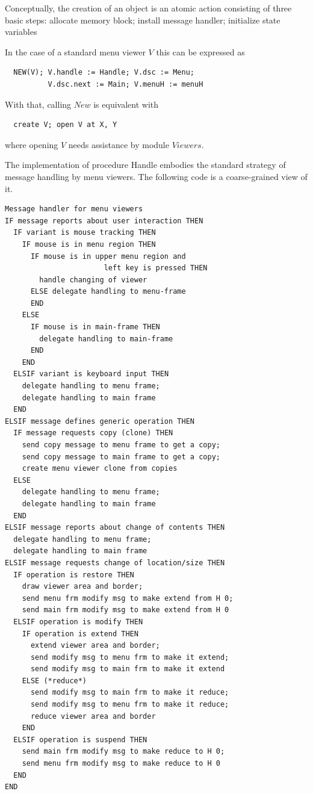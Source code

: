 Conceptually, the creation of an object is an atomic action consisting of three basic steps:
allocate memory block; install message handler; initialize state variables

In the case of a standard menu viewer $V$ this can be expressed as
\begin{verbatim}
  NEW(V); V.handle := Handle; V.dsc := Menu;
          V.dsc.next := Main; V.menuH := menuH
\end{verbatim}
With that, calling $New$ is equivalent with
\begin{verbatim}
  create V; open V at X, Y
\end{verbatim}
where opening $V$ needs assistance by module $Viewers$.

The implementation of procedure Handle embodies the standard strategy of message handling by
menu viewers. The following code is a coarse-grained view of it.
\begin{verbatim}
Message handler for menu viewers
IF message reports about user interaction THEN
  IF variant is mouse tracking THEN
    IF mouse is in menu region THEN
      IF mouse is in upper menu region and
                       left key is pressed THEN
        handle changing of viewer
      ELSE delegate handling to menu-frame
      END
    ELSE
      IF mouse is in main-frame THEN
        delegate handling to main-frame
      END
    END
  ELSIF variant is keyboard input THEN
    delegate handling to menu frame;
    delegate handling to main frame
  END
ELSIF message defines generic operation THEN
  IF message requests copy (clone) THEN
    send copy message to menu frame to get a copy;
    send copy message to main frame to get a copy;
    create menu viewer clone from copies
  ELSE
    delegate handling to menu frame;
    delegate handling to main frame
  END
ELSIF message reports about change of contents THEN
  delegate handling to menu frame;
  delegate handling to main frame
ELSIF message requests change of location/size THEN
  IF operation is restore THEN
    draw viewer area and border;
    send menu frm modify msg to make extend from H 0;
    send main frm modify msg to make extend from H 0
  ELSIF operation is modify THEN
    IF operation is extend THEN
      extend viewer area and border;
      send modify msg to menu frm to make it extend;
      send modify msg to main frm to make it extend
    ELSE (*reduce*)
      send modify msg to main frm to make it reduce;
      send modify msg to menu frm to make it reduce;
      reduce viewer area and border
    END
  ELSIF operation is suspend THEN
    send main frm modify msg to make reduce to H 0;
    send menu frm modify msg to make reduce to H 0
  END
END
\end{verbatim}

